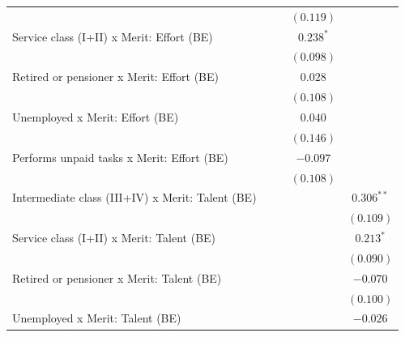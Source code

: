 \documentclass[
  12pt,
]{article}
\begin{document}
\begin{table}
\begin{center}
{\begin{tabular}{l c c c c}
                                                                &             &             & $(0.119)$    &              \\
\quad Service class (I+II) x Merit: Effort (BE)                 &             &             & $0.238^{*}$  &              \\
                                                                &             &             & $(0.098)$    &              \\
\quad Retired or pensioner x Merit: Effort (BE)                 &             &             & $0.028$      &              \\
                                                                &             &             & $(0.108)$    &              \\
\quad Unemployed x Merit: Effort (BE)                           &             &             & $0.040$      &              \\
                                                                &             &             & $(0.146)$    &              \\
\quad Performs unpaid tasks x Merit: Effort (BE)                &             &             & $-0.097$     &              \\
                                                                &             &             & $(0.108)$    &              \\
\quad Intermediate class (III+IV) x Merit: Talent (BE)          &             &             &              & $0.306^{**}$ \\
                                                                &             &             &              & $(0.109)$    \\
\quad Service class (I+II) x Merit: Talent (BE)                 &             &             &              & $0.213^{*}$  \\
                                                                &             &             &              & $(0.090)$    \\
\quad Retired or pensioner x Merit: Talent (BE)                 &             &             &              & $-0.070$     \\
                                                                &             &             &              & $(0.100)$    \\
\quad Unemployed x Merit: Talent (BE)                           &             &             &              & $-0.026$     \\

\end{tabular}}
\end{center}
\end{table}
\end{document}
